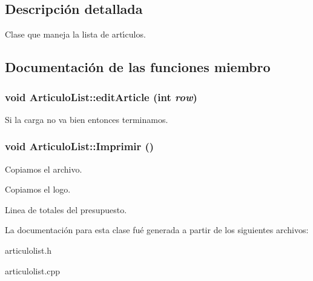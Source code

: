 \subsection{Descripci\'{o}n detallada}
Clase que maneja la lista de art\'{\i}culos. 



\subsection{Documentaci\'{o}n de las funciones miembro}
\subsubsection{\setlength{\rightskip}{0pt plus 5cm}void Articulo\-List::edit\-Article (int {\em row})}\label{classArticuloList_a4}


Si la carga no va bien entonces terminamos. 
\subsubsection{\setlength{\rightskip}{0pt plus 5cm}void Articulo\-List::Imprimir ()}\label{classArticuloList_a10}


Copiamos el archivo.

Copiamos el logo.

Linea de totales del presupuesto. 

La documentaci\'{o}n para esta clase fu\'{e} generada a partir de los siguientes archivos:\begin{CompactItemize}
\item 
articulolist.h\item 
articulolist.cpp\end{CompactItemize}
